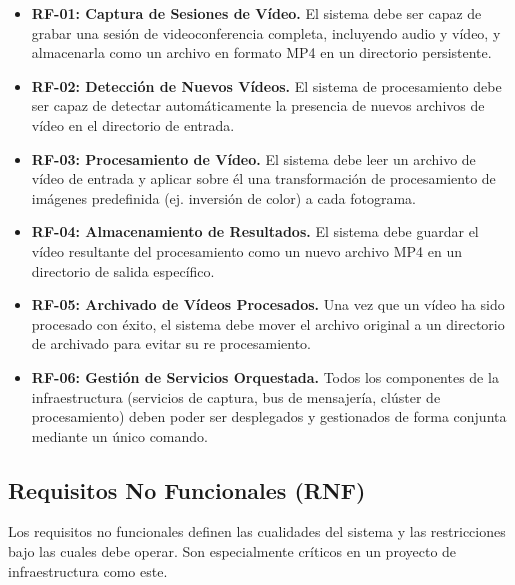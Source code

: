\begin{itemize}
    \item \textbf{RF-01: Captura de Sesiones de Vídeo.} El sistema debe ser capaz de grabar una sesión de videoconferencia completa, incluyendo audio y vídeo, y almacenarla como un archivo en formato MP4 en un directorio persistente.
    
    \item \textbf{RF-02: Detección de Nuevos Vídeos.} El sistema de procesamiento debe ser capaz de detectar automáticamente la presencia de nuevos archivos de vídeo en el directorio de entrada.
    
    \item \textbf{RF-03: Procesamiento de Vídeo.} El sistema debe leer un archivo de vídeo de entrada y aplicar sobre él una transformación de procesamiento de imágenes predefinida (ej. inversión de color) a cada fotograma.
    
    \item \textbf{RF-04: Almacenamiento de Resultados.} El sistema debe guardar el vídeo resultante del procesamiento como un nuevo archivo MP4 en un directorio de salida específico.
    
    \item \textbf{RF-05: Archivado de Vídeos Procesados.} Una vez que un vídeo ha sido procesado con éxito, el sistema debe mover el archivo original a un directorio de archivado para evitar su re procesamiento.
    
    \item \textbf{RF-06: Gestión de Servicios Orquestada.} Todos los componentes de la infraestructura (servicios de captura, bus de mensajería, clúster de procesamiento) deben poder ser desplegados y gestionados de forma conjunta mediante un único comando.
\end{itemize}

\subsection{Requisitos No Funcionales (RNF)}
Los requisitos no funcionales definen las cualidades del sistema y las restricciones bajo las cuales debe operar. Son especialmente críticos en un proyecto de infraestructura como este.

